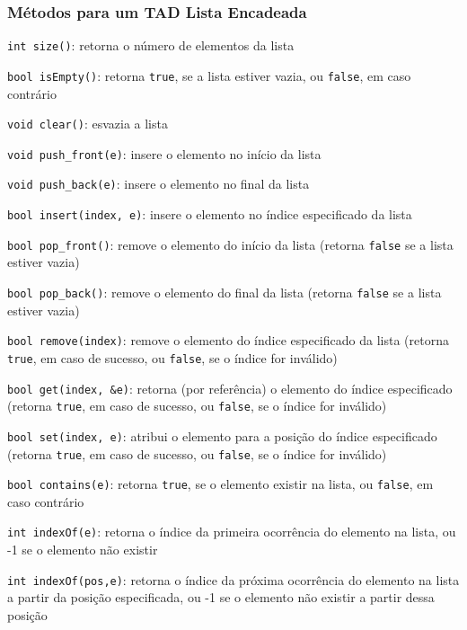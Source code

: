 \documentclass[aspectratio=169]{beamer}
\begin{document}
\begin{frame}\frametitle{Métodos para um TAD Lista Encadeada}
\begin{itemize}
{\scriptsize
	\item \texttt{int size()}: retorna o número de elementos da lista\\
	\item \texttt{bool isEmpty()}: retorna \texttt{true}, se a lista estiver vazia, ou \texttt{false}, em caso contrário\\
	\item \texttt{void clear()}: esvazia a lista\\
	\item \texttt{void push\_front(e)}: insere o elemento no início da lista\\
	\item \texttt{void push\_back(e)}: insere o elemento no final da lista\\
	\item \texttt{bool insert(index, e)}: insere o elemento no índice especificado da lista\\
	\item \texttt{bool pop\_front()}: remove o elemento do início da lista (retorna \texttt{false} se a lista estiver vazia)\\
	\item \texttt{bool pop\_back()}: remove o elemento do final da lista (retorna \texttt{false} se a lista estiver vazia)\\
	\item \texttt{bool remove(index)}: remove o elemento do índice especificado da lista (retorna \texttt{true}, em caso de sucesso, ou \texttt{false}, se o índice for inválido)\\
	\item \texttt{bool get(index, \&e)}: retorna (por referência) o elemento do índice especificado (retorna \texttt{true}, em caso de sucesso, ou \texttt{false}, se o índice for inválido)\\
	\item \texttt{bool set(index, e)}: atribui o elemento para a posição do índice especificado (retorna \texttt{true}, em caso de sucesso, ou \texttt{false}, se o índice for inválido)\\
	\item \texttt{bool contains(e)}: retorna \texttt{true}, se o elemento existir na lista, ou \texttt{false}, em caso contrário\\
	\item \texttt{int indexOf(e)}: retorna o índice da primeira ocorrência do elemento na lista, ou -1 se o elemento não existir\\
	\item \texttt{int indexOf(pos,e)}: retorna o índice da próxima ocorrência do elemento na lista a partir da posição especificada, ou -1 se o elemento não existir a partir dessa posição\\
}	
\end{itemize}
\end{frame}
\end{document}
